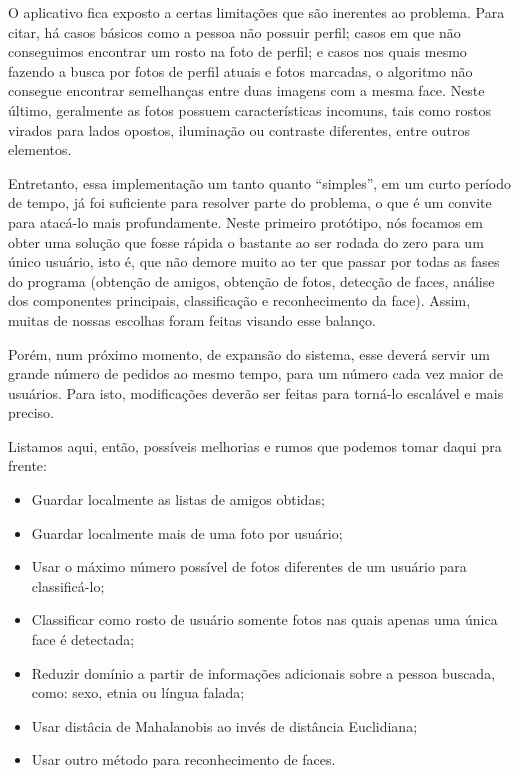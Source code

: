\documentclass[10pt,a4paper]{article}
\begin{document}
	O aplicativo fica exposto a certas limitações que são inerentes ao problema. Para citar, há casos básicos como a pessoa não possuir perfil; casos em que não conseguimos encontrar um rosto na foto de perfil; e casos nos quais mesmo fazendo a busca por fotos de perfil atuais e fotos marcadas, o algoritmo não consegue encontrar semelhanças entre duas imagens com a mesma face. Neste último, geralmente as fotos possuem características incomuns, tais como rostos virados para lados opostos, iluminação ou contraste diferentes, entre outros elementos.

	Entretanto, essa implementação um tanto quanto “simples”, em um curto período de tempo, já foi suficiente para resolver parte do problema, o que é um convite para atacá-lo mais profundamente. Neste primeiro protótipo, nós focamos em obter uma solução que fosse rápida o bastante ao ser rodada do zero para um único usuário, isto é, que não demore muito ao ter que passar por todas as fases do programa (obtenção de amigos, obtenção de fotos, detecção de faces, análise dos componentes principais, classificação e reconhecimento da face). Assim, muitas de nossas escolhas foram feitas visando esse balanço.

	Porém, num próximo momento, de expansão do sistema, esse
        deverá servir um grande número de pedidos ao mesmo tempo, para
        um número cada vez maior de usuários. Para isto, modificações
        deverão ser feitas para torná-lo escalável e mais preciso. 

Listamos aqui, então, possíveis melhorias e rumos que podemos tomar
daqui pra frente:
\begin{itemize}
	\item Guardar localmente as listas de amigos obtidas;
	\item Guardar localmente mais de uma foto por usuário;
	\item Usar o máximo número possível de fotos diferentes de um usuário para classificá-lo;
	\item Classificar como rosto de usuário somente fotos nas quais apenas uma única face é detectada;
	\item Reduzir domínio a partir de informações adicionais sobre a pessoa buscada, como: sexo, etnia ou língua falada;
	\item Usar distâcia de Mahalanobis ao invés de distância Euclidiana;
	\item Usar outro método para reconhecimento de faces.
\end{itemize}
\vspace{-0.5cm}

\begin{small}
  
\end{small}
\end{document}

